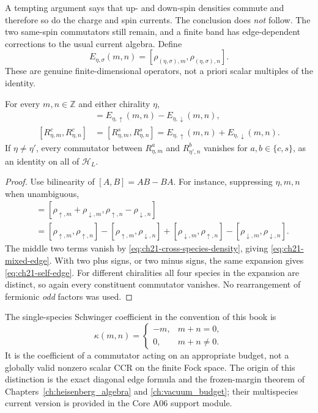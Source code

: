 A tempting argument says that up- and down-spin densities commute and
therefore so do the charge and spin currents.  The conclusion does
\emph{not} follow.  The two same-spin commutators still remain, and a
finite band has edge-dependent corrections to the usual current algebra.
Define
\begin{equation}
 E_{\eta,\sigma}(m,n)
  =[\rho_{(\eta,\sigma),m},\rho_{(\eta,\sigma),n}].
 \label{eq:ch21-edge-operator}
\end{equation}
These are genuine finite-dimensional operators, not a priori scalar
multiples of the identity.

\begin{proposition}
\label{prop:ch21-global-edge}
For every $m,n\in\mathbb Z$ and either chirality $\eta$,
\begin{align}
 [R^c_{\eta,m},R^s_{\eta,n}]
   &=E_{\eta,\uparrow}(m,n)-E_{\eta,\downarrow}(m,n),
       \label{eq:ch21-mixed-edge}\\
 [R^c_{\eta,m},R^c_{\eta,n}]
   &=[R^s_{\eta,m},R^s_{\eta,n}]
     =E_{\eta,\uparrow}(m,n)+E_{\eta,\downarrow}(m,n).
       \label{eq:ch21-self-edge}
\end{align}
If $\eta\ne\eta'$, every commutator between
$R^a_{\eta,m}$ and $R^b_{\eta',n}$ vanishes for
$a,b\in\{c,s\}$, as an identity on all of $\mathcal H_L$.
\end{proposition}
\begin{proof}
Use bilinearity of $[A,B]=AB-BA$.  For instance, suppressing
$\eta,m,n$ when unambiguous,
\begin{align*}
 [R^c_m,R^s_n]
  &=[\rho_{\uparrow,m}+\rho_{\downarrow,m},
      \rho_{\uparrow,n}-\rho_{\downarrow,n}]\\
  &=[\rho_{\uparrow,m},\rho_{\uparrow,n}]
    -[\rho_{\uparrow,m},\rho_{\downarrow,n}]
    +[\rho_{\downarrow,m},\rho_{\uparrow,n}]
    -[\rho_{\downarrow,m},\rho_{\downarrow,n}].
\end{align*}
The middle two terms vanish by
\eqref{eq:ch21-cross-species-density}, giving
\eqref{eq:ch21-mixed-edge}.  With two plus signs, or two minus signs,
the same expansion gives \eqref{eq:ch21-self-edge}.  For different
chiralities all four species in the expansion are distinct, so again
every constituent commutator vanishes.  No rearrangement of fermionic
\emph{odd} factors was used.
\end{proof}

The single-species Schwinger coefficient in the convention of this book is
\begin{equation}
 \kappa(m,n)=
 \begin{cases}-m,&m+n=0,\\0,&m+n\ne0.\end{cases}
 \label{eq:ch21-schwinger-coefficient}
\end{equation}
It is the coefficient of a commutator acting on an appropriate budget,
not a globally valid nonzero scalar CCR on the finite Fock space.  The
origin of this distinction is the exact diagonal edge formula and the
frozen-margin theorem of Chapters~\ref{ch:heisenberg_algebra} and
\ref{ch:vacuum_budget}; their multispecies current version is provided
in the Core A06 support module.

